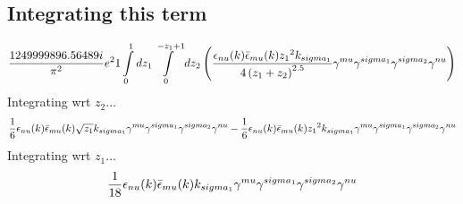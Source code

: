 \subsection*{Integrating this term}
\begin{dmath}\frac{1249999896.56489 i}{\pi^{2}} e^{2}1\int\limits_{ 0 }^{ 1 } d{ z_{ 1 } }\int\limits_{ 0 }^{ - { z_{ 1 } } + 1 } d{ z_{ 2 } }\left(\frac{\epsilon_{ \\nu }({ k }) \bar{\epsilon}_{ \\mu }({ k }) { z_{ 1 } }^{2} { { k }_{ \\sigma_1 } }}{4 \left({ z_{ 1 } } + { z_{ 2 } }\right)^{2.5}} { \gamma^{ \\mu } } { \gamma^{ \\sigma_1 } } { \gamma^{ \\sigma_2 } } { \gamma^{ \\nu } }\right)\end{dmath}
Integrating wrt ${ z_{ 2 } }$...
\begin{dmath}\frac{1}{6} \epsilon_{ \\nu }({ k }) \bar{\epsilon}_{ \\mu }({ k }) \sqrt{{ z_{ 1 } }} { { k }_{ \\sigma_1 } } { \gamma^{ \\mu } } { \gamma^{ \\sigma_1 } } { \gamma^{ \\sigma_2 } } { \gamma^{ \\nu } } - \frac{1}{6} \epsilon_{ \\nu }({ k }) \bar{\epsilon}_{ \\mu }({ k }) { z_{ 1 } }^{2} { { k }_{ \\sigma_1 } } { \gamma^{ \\mu } } { \gamma^{ \\sigma_1 } } { \gamma^{ \\sigma_2 } } { \gamma^{ \\nu } }\end{dmath}
Integrating wrt ${ z_{ 1 } }$...
\begin{dmath}\frac{1}{18} \epsilon_{ \\nu }({ k }) \bar{\epsilon}_{ \\mu }({ k }) { { k }_{ \\sigma_1 } } { \gamma^{ \\mu } } { \gamma^{ \\sigma_1 } } { \gamma^{ \\sigma_2 } } { \gamma^{ \\nu } }\end{dmath}
